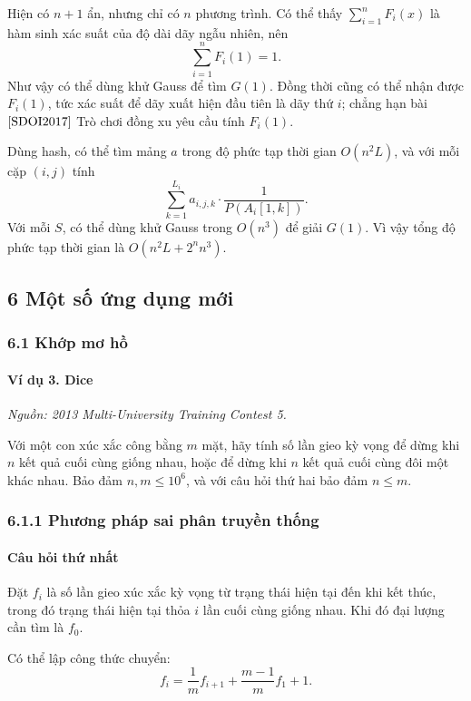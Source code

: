 \documentclass[11pt]{article}
\begin{document}
Hiện có \(n+1\) ẩn, nhưng chỉ có \(n\) phương trình. Có thể thấy
\(\sum_{i=1}^{n}F_i(x)\) là hàm sinh xác suất của độ dài dãy ngẫu nhiên, nên
\[
  \sum_{i=1}^{n}F_i(1)=1 .
\]
Như vậy có thể dùng khử Gauss để tìm \(G(1)\). Đồng thời cũng có thể nhận được
\(F_i(1)\), tức xác suất để dãy xuất hiện đầu tiên là dãy thứ \(i\); chẳng hạn
bài \([{\rm SDOI2017}]\) Trò chơi đồng xu yêu cầu tính \(F_i(1)\).

Dùng hash, có thể tìm mảng \(a\) trong độ phức tạp thời gian \(O(n^2L)\), và
với mỗi cặp \((i,j)\) tính
\[
  \sum_{k=1}^{L_i}a_{i,j,k}\cdot\frac{1}{P(A_i[1,k])}.
\]
Với mỗi \(S\), có thể dùng khử Gauss trong \(O(n^3)\) để giải \(G(1)\). Vì vậy
tổng độ phức tạp thời gian là \(O(n^2L+2^n n^3)\).

\subsection*{6 Một số ứng dụng mới}

\subsubsection*{6.1 Khớp mơ hồ}

\paragraph{Ví dụ 3. Dice}
\noindent\emph{Nguồn: 2013 Multi-University Training Contest 5.}

Với một con xúc xắc công bằng \(m\) mặt, hãy tính số lần gieo kỳ vọng để dừng
khi \(n\) kết quả cuối cùng giống nhau, hoặc để dừng khi \(n\) kết quả cuối cùng
đôi một khác nhau. Bảo đảm \(n,m\le 10^6\), và với câu hỏi thứ hai bảo đảm
\(n\le m\).

\subsubsection*{6.1.1 Phương pháp sai phân truyền thống}

\paragraph{Câu hỏi thứ nhất}
Đặt \(f_i\) là số lần gieo xúc xắc kỳ vọng từ trạng thái hiện tại đến khi kết
thúc, trong đó trạng thái hiện tại thỏa \(i\) lần cuối cùng giống nhau. Khi đó
đại lượng cần tìm là \(f_0\).

Có thể lập công thức chuyển:
\[
  f_i=\frac{1}{m}f_{i+1}+\frac{m-1}{m}f_1+1 .
\]
\end{document}
